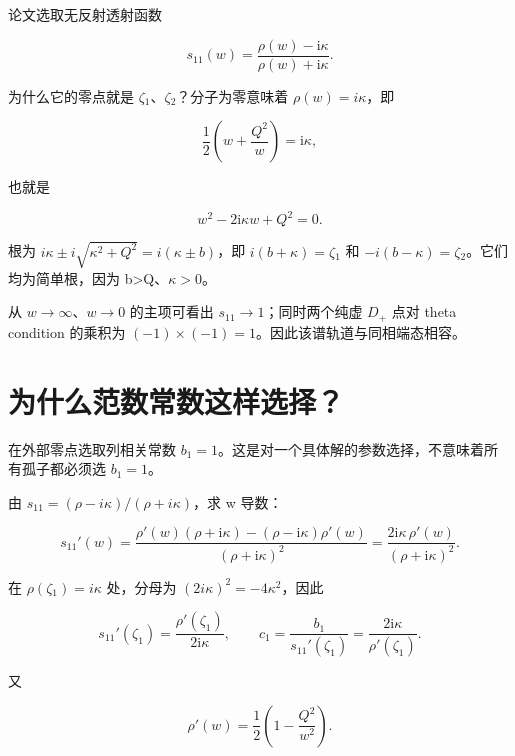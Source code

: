 论文选取无反射透射函数\par

\[
s_{11}(w)=\dfrac{\rho(w)-\mathrm{i}\kappa}
{\rho(w)+\mathrm{i}\kappa}.
\]

为什么它的零点就是 $\zeta{}_{1}$、$\zeta{}_{2}$？分子为零意味着 $\rho{}(w)=i\kappa{}$，即\par

\[
\dfrac{1}{2}\left(w+\dfrac{Q^2}{w}\right)=\mathrm{i}\kappa,
\]

也就是\par

\[
w^2-2\mathrm{i}\kappa w+Q^2=0.
\]

根为 $i\kappa{}\pm{}i\sqrt{\kappa{}^{2}+Q^{2}}=i(\kappa{}\pm{}b)$，即 $i(b+\kappa{})=\zeta{}_{1}$ 和 $-i(b-\kappa{})=\zeta{}_{2}$。它们均为简单根，因为 b>Q、$\kappa{}>0$。\par

从 $w\to{}\infty{}$、$w\to{}0$ 的主项可看出 $s_{11}\to{}1$；同时两个纯虚 $D_{+}$ 点对 theta condition 的乘积为 $(-1)\times{}(-1)=1$。因此该谱轨道与同相端态相容。\par

\section{为什么范数常数这样选择？}
\par

在外部零点选取列相关常数 $b_{1}=1$。这是对一个具体解的参数选择，不意味着所有孤子都必须选 $b_{1}=1$。\par

由 $s_{11}=(\rho{}-i\kappa{})/(\rho{}+i\kappa{})$，求 w 导数：\par

\[
s_{11}'(w)
=\dfrac{\rho'(w)(\rho+\mathrm{i}\kappa)
-(\rho-\mathrm{i}\kappa)\rho'(w)}
{(\rho+\mathrm{i}\kappa)^2}
=\dfrac{2\mathrm{i}\kappa\,\rho'(w)}
{(\rho+\mathrm{i}\kappa)^2}.
\]

在 $\rho{}(\zeta{}_{1})=i\kappa{}$ 处，分母为 $(2i\kappa{})^{2}=-4\kappa{}^{2}$，因此\par

\[
s_{11}'(\zeta_1)=\dfrac{\rho'(\zeta_1)}{2\mathrm{i}\kappa},
\qquad
c_1=\dfrac{b_1}{s_{11}'(\zeta_1)}
=\dfrac{2\mathrm{i}\kappa}{\rho'(\zeta_1)}.
\]

又\par

\[
\rho'(w)=\dfrac{1}{2}\left(1-\dfrac{Q^2}{w^2}\right).
\]

